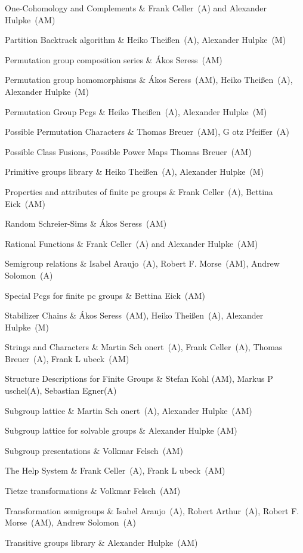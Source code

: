 One-Cohomology and Complements &
Frank Celler~(A) and Alexander Hulpke~(AM)

Partition Backtrack algorithm &
Heiko Thei{\ss}en~(A), Alexander Hulpke~(M)

Permutation group composition series &
{\'A}kos Seress~(AM)

Permutation group homomorphisms &
{\'A}kos Seress~(AM), Heiko Thei{\ss}en~(A), Alexander Hulpke~(M)

Permutation Group Pcgs &
Heiko Thei{\ss}en~(A), Alexander Hulpke~(M)

Possible Permutation Characters &
Thomas Breuer~(AM), G{ o}tz Pfeiffer~(A)

Possible Class Fusions, Possible Power Maps
Thomas Breuer~(AM)

Primitive groups library &
Heiko Thei{\ss}en~(A), Alexander Hulpke~(M)

Properties and attributes of finite pc groups &
Frank Celler~(A), Bettina Eick~(AM)

Random Schreier-Sims &
{\'A}kos Seress~(AM)

Rational Functions &
Frank Celler~(A) and Alexander Hulpke~(AM)

Semigroup relations &
Isabel Araujo~(A), Robert F. Morse~(AM), Andrew Solomon~(A)

Special Pcgs for finite pc groups &
Bettina Eick~(AM)

Stabilizer Chains &
{\'A}kos Seress~(AM), Heiko Thei{\ss}en~(A), Alexander Hulpke~(M)

Strings and Characters & 
Martin Sch{ o}nert~(A), Frank Celler~(A), Thomas Breuer~(A), 
Frank L{ u}beck~(AM)

Structure Descriptions for Finite Groups &
Stefan Kohl (AM), Markus P{ u}schel(A), Sebastian Egner(A)

Subgroup lattice &
Martin Sch{ o}nert~(A), Alexander Hulpke~(AM)

Subgroup lattice for solvable groups &
Alexander Hulpke (AM)

Subgroup presentations &
Volkmar Felsch~(AM)

The Help System &
Frank Celler~(A), Frank L{ u}beck~(AM)

Tietze transformations &
Volkmar Felsch~(AM)

Transformation semigroups &
Isabel Araujo~(A), Robert Arthur~(A), Robert F. Morse~(AM), 
Andrew Solomon~(A)

Transitive groups library &
Alexander Hulpke~(AM)

